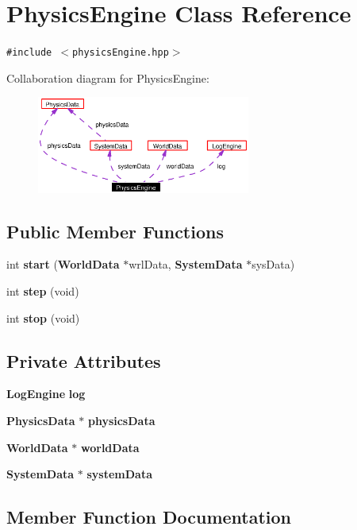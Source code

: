 \section{Physics\-Engine Class Reference}
\label{classPhysicsEngine}
{\tt \#include $<$physics\-Engine.hpp$>$}

Collaboration diagram for Physics\-Engine:\begin{figure}[H]
\begin{center}
\leavevmode
\includegraphics[width=199pt]{classPhysicsEngine__coll__graph}
\end{center}
\end{figure}
\subsection*{Public Member Functions}
\begin{CompactItemize}
\item 
int {\bf start} ({\bf World\-Data} $\ast$wrl\-Data, {\bf System\-Data} $\ast$sys\-Data)
\item 
int {\bf step} (void)
\item 
int {\bf stop} (void)
\end{CompactItemize}
\subsection*{Private Attributes}
\begin{CompactItemize}
\item 
{\bf Log\-Engine} {\bf log}
\item 
{\bf Physics\-Data} $\ast$ {\bf physics\-Data}
\item 
{\bf World\-Data} $\ast$ {\bf world\-Data}
\item 
{\bf System\-Data} $\ast$ {\bf system\-Data}
\end{CompactItemize}


\subsection{Member Function Documentation}
